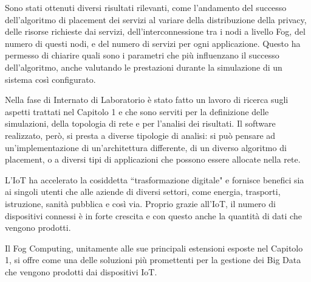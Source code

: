 \documentclass[a4paper,11pt]{article}
\begin{document}
Sono stati ottenuti diversi risultati rilevanti, come l'andamento del successo dell'algoritmo di placement dei servizi al variare della distribuzione della privacy, delle risorse richieste dai servizi, dell'interconnessione tra i nodi a livello Fog, del numero di questi nodi, e del numero di servizi per ogni applicazione. Questo ha permesso di chiarire quali sono i parametri che più influenzano il successo dell'algoritmo, anche valutando le prestazioni durante la simulazione di un sistema così configurato.

Nella fase di Internato di Laboratorio è stato fatto un lavoro di ricerca sugli aspetti trattati nel Capitolo 1 e che sono serviti per la definizione delle simulazioni, della topologia di rete e per l'analisi dei risultati. Il software realizzato, però, si presta a diverse tipologie di analisi: si può pensare ad un'implementazione di un'architettura differente, di un diverso algoritmo di placement, o a diversi tipi di applicazioni che possono essere allocate nella rete. 

L'IoT ha accelerato la cosiddetta ``trasformazione digitale" e fornisce benefici sia ai singoli utenti che alle aziende di diversi settori, come energia, trasporti, istruzione, sanità pubblica e così via. Proprio grazie all'IoT, il numero di dispositivi connessi è in forte crescita e con questo anche la quantità di dati che vengono prodotti.

Il Fog Computing, unitamente alle sue principali estensioni esposte nel Capitolo 1, si offre come una delle soluzioni più promettenti per la gestione dei Big Data che vengono prodotti dai dispositivi IoT.


   	
\end{document}
